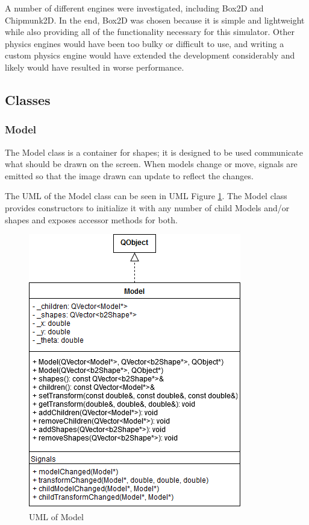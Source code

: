  	A number of different engines were investigated, including Box2D and Chipmunk2D. In the end, Box2D was chosen because it is simple and lightweight while also providing all of the functionality necessary for this simulator. Other physics engines would have been too bulky or difficult to use, and writing a custom physics engine would have extended the development considerably and likely would have resulted in worse performance.


 \newpage
\subsection{Classes}
  \subsubsection*{Model}
  The Model class is a container for shapes; it is designed to be used communicate what should be drawn on the screen. When models change or move, signals are emitted so that the image drawn can update to reflect the changes.
  
 	The UML of the Model class can be seen in UML Figure \ref{uml:model}. The Model class provides constructors to initialize it with any number of child Models and/or shapes and exposes accessor methods for both.

 \begin{figure}[h]
 	\begin{center}
 	\includegraphics[scale=0.5]{./images_design/uml/Model}
 	\caption{UML of Model\label{uml:model}}
 	\end{center}
 \end{figure}  
 
